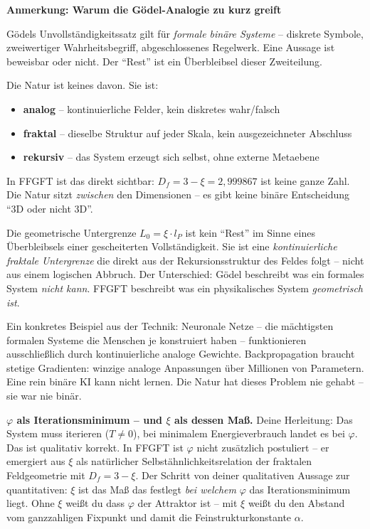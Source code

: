 \documentclass[12pt, a4paper]{article}
\newcommand{\xipar}{\xi}
\newcommand{\Dfrak}{D_f}
\begin{document}
\begin{response}
\medskip
\begin{mdframed}[backgroundcolor=T0gray, linecolor=T0gold, linewidth=1.2pt,
  innerleftmargin=12pt, innerrightmargin=12pt, innertopmargin=8pt, innerbottommargin=8pt]
\textbf{Anmerkung: Warum die Gödel-Analogie zu kurz greift}

Gödels Unvollständigkeitssatz gilt für \emph{formale binäre Systeme} -- diskrete Symbole, zweiwertiger Wahrheitsbegriff, abgeschlossenes Regelwerk. Eine Aussage ist beweisbar oder nicht. Der ``Rest'' ist ein Überbleibsel dieser Zweiteilung.

Die Natur ist keines davon. Sie ist:
\begin{itemize}[noitemsep]
  \item \textbf{analog} -- kontinuierliche Felder, kein diskretes wahr/falsch
  \item \textbf{fraktal} -- dieselbe Struktur auf jeder Skala, kein ausgezeichneter Abschluss
  \item \textbf{rekursiv} -- das System erzeugt sich selbst, ohne externe Metaebene
\end{itemize}

In FFGFT ist das direkt sichtbar: $\Dfrak = 3 - \xipar = 2{,}999867$ ist keine ganze Zahl. Die Natur sitzt \emph{zwischen} den Dimensionen -- es gibt keine binäre Entscheidung ``3D oder nicht 3D''.

Die geometrische Untergrenze $L_0 = \xipar \cdot l_P$ ist kein ``Rest'' im Sinne eines Überbleibsels einer gescheiterten Vollständigkeit. Sie ist eine \emph{kontinuierliche fraktale Untergrenze} die direkt aus der Rekursionsstruktur des Feldes folgt -- nicht aus einem logischen Abbruch. Der Unterschied: Gödel beschreibt was ein formales System \emph{nicht kann}. FFGFT beschreibt was ein physikalisches System \emph{geometrisch ist}.

\medskip
Ein konkretes Beispiel aus der Technik: Neuronale Netze -- die mächtigsten formalen Systeme die Menschen je konstruiert haben -- funktionieren ausschließlich durch kontinuierliche analoge Gewichte. Backpropagation braucht stetige Gradienten: winzige analoge Anpassungen über Millionen von Parametern. Eine rein binäre KI kann nicht lernen. Die Natur hat dieses Problem nie gehabt -- sie war nie binär.
\end{mdframed}

\medskip
\textbf{$\varphi$ als Iterationsminimum -- und $\xipar$ als dessen Maß.}
Deine Herleitung: Das System muss iterieren ($T \neq 0$), bei minimalem Energieverbrauch landet es bei $\varphi$. Das ist qualitativ korrekt. In FFGFT ist $\varphi$ nicht zusätzlich postuliert -- er emergiert aus $\xipar$ als natürlicher Selbstähnlichkeitsrelation der fraktalen Feldgeometrie mit $\Dfrak = 3 - \xipar$. Der Schritt von deiner qualitativen Aussage zur quantitativen: $\xipar$ ist das Maß das festlegt \emph{bei welchem} $\varphi$ das Iterationsminimum liegt. Ohne $\xipar$ weißt du dass $\varphi$ der Attraktor ist -- mit $\xipar$ weißt du den Abstand vom ganzzahligen Fixpunkt und damit die Feinstrukturkonstante $\alpha$.


\end{response}
\end{document}
